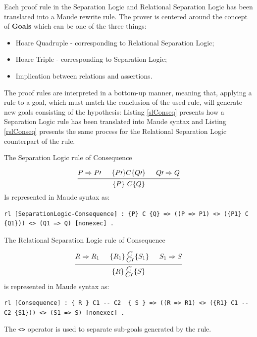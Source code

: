 \documentclass[12pt,a4paper]{article}
\newcommand{\hq}[4]{
	\left\{{#1}\right\}
	\let\scriptstyle\textstyle 
	\substack{{#2} \\ 	\let\scriptstyle\textstyle {#3}} 
	\left\{{#4}\right\}
}
\begin{document}
{Each proof rule in the Separation Logic and Relational Separation Logic has been translated into a Maude rewrite rule. The prover is centered around the concept of \textbf{Goals} which can be one of the three things: 
\begin{itemize}
	\item {Hoare Quadruple} - corresponding to Relational Separation Logic;
	\item {Hoare Triple} - corresponding to Separation Logic;
	\item {Implication between relations and assertions}.
\end{itemize} 
The proof rules are interpreted in a bottom-up manner, meaning that, applying a rule to a goal, which must match the conclusion of the used rule, will generate new goals consisting of the hypothesis: Listing \ref{slConseq} presents how a Separation Logic rule has been translated into Maude syntax and Listing \ref{rslConseq} presents the same process for the Relational Separation Logic counterpart of the rule.
\begin{flushleft}
	The Separation Logic rule of \textsf{Consequence}
\end{flushleft}
	\medskip
	\[
	\begin{prooftree}
	\Hypo{P \Rightarrow P\prime}
	\Hypo{\{P\prime\} C \{Q\prime\}}
	\Hypo{Q\prime \Rightarrow Q}
	\Infer 3 {\{P\}\  C  \{Q\}}
	\end{prooftree}	
	\]
	Is represented in Maude syntax as: 
\begin{lstlisting}[caption=Separation Logic Consequence rule,label=slConseq]
	rl [SeparationLogic-Consequence] : {P} C {Q} => ((P => P1) <> ({P1} C {Q1})) <> (Q1 => Q) [nonexec] .
\end{lstlisting}
\begin{flushleft}
	The Relational Separation Logic rule of \textsf{Consequence}
\end{flushleft}
	\[
	\begin{prooftree}
	\Hypo{R \Rightarrow R_1}
	\Hypo{\hq{R_1}{C}{C\prime}{S_1}}
	\Hypo{S_1 \Rightarrow S}
	\Infer 3 {\hq{R}{C}{C\prime}{S}}
	\end{prooftree}	
	\]
	is represented in Maude syntax as: 
	\begin{lstlisting}[caption=Relational Separation Logic Consequence rule,label=rslConseq]
	rl [Consequence] : { R } C1 -- C2  { S } => ((R => R1) <> ({R1} C1 -- C2 {S1})) <> (S1 => S) [nonexec] .
	\end{lstlisting}
The \texttt{<>} operator is used to separate sub-goals generated by the rule.
\\

}
\end{document}
